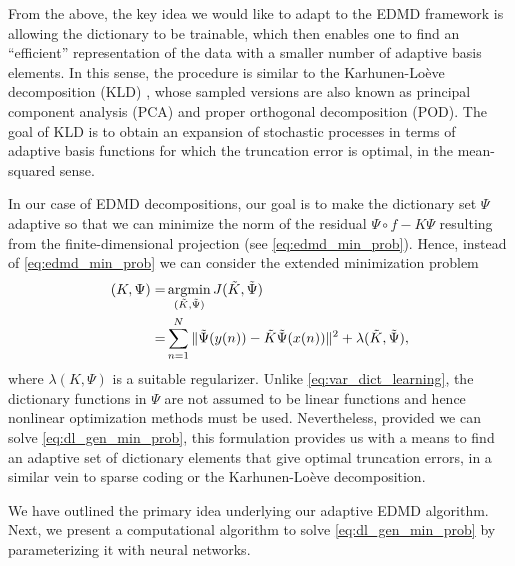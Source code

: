 \documentclass[%
 aip,
 cha,
 sd,%
 amsmath,amssymb,
 preprint,%
]{revtex4-1}
\begin{document}
From the above, the key idea we would like to adapt to the EDMD framework is allowing the dictionary to be trainable, which then enables one to find an ``efficient'' representation of the data with a smaller number of adaptive basis elements. In this sense, the procedure is similar to the Karhunen-Lo\`{e}ve decomposition (KLD) \cite{karhunen1947lineare,loeve1978probability}, whose sampled versions are also known as principal component analysis (PCA) and proper orthogonal decomposition (POD). The goal of KLD is to obtain an expansion of stochastic processes in terms of adaptive basis functions for which the truncation error is optimal, in the mean-squared sense. 

In our case of EDMD decompositions, our goal is to make the dictionary set $\Psi$ adaptive so that we can minimize the norm of the residual $\Psi\circ f-K\Psi$ resulting from the finite-dimensional projection (see \eqref{eq:edmd_min_prob}). Hence, instead of \eqref{eq:edmd_min_prob} we can consider the extended minimization problem
\begin{align}
	(K, \Psi) =& \operatornamewithlimits{arg min}_{(\tilde{K}, \tilde{\Psi})} J(\tilde{K},\tilde{\Psi}) \nonumber\\
	=& \sum_{n=1}^{N} {\Vert \tilde{\Psi}(y(n)) - \tilde{K}\tilde{\Psi}(x(n)) \Vert^2} + \lambda(\tilde{K},\tilde{\Psi}),
	\label{eq:dl_gen_min_prob}
\end{align}
where $\lambda(K,\Psi)$ is a suitable regularizer. Unlike \eqref{eq:var_dict_learning}, the dictionary functions in $\Psi$ are not assumed to be linear functions and hence nonlinear optimization methods must be used. Nevertheless, provided we can solve \eqref{eq:dl_gen_min_prob}, this formulation provides us with a means to find an adaptive set of dictionary elements that give optimal truncation errors, in a similar vein to sparse coding or the Karhunen-Lo\`{e}ve decomposition.

We have outlined the primary idea underlying our adaptive EDMD algorithm. Next, we present a computational algorithm to solve \eqref{eq:dl_gen_min_prob} by parameterizing it with neural networks. 

\end{document}

